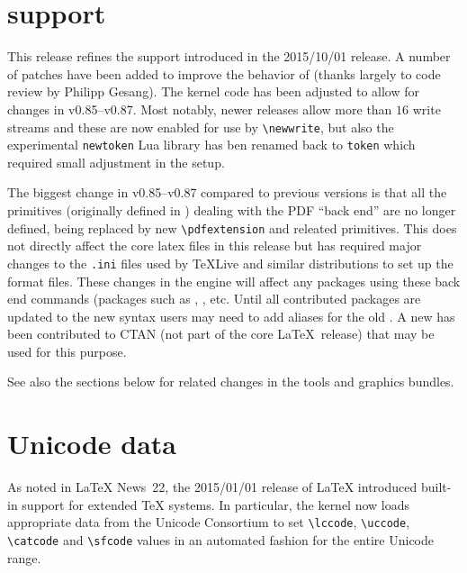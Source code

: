 \documentclass{ltnews}
\begin{document}
\maketitle

\tableofcontents

\section{ support}

This release refines the  support introduced in the
2015/10/01 release. A number of patches have been added to improve the
behavior of  (thanks largely to code review by Philipp Gesang).
The kernel code has been adjusted to
allow for changes in  v0.85--v0.87. Most notably, newer
 releases allow more than $16$ write streams and these are now
enabled for use by \verb|\newwrite|, but also the experimental
\texttt{newtoken} Lua library  has ben renamed back to \texttt{token}
which required small adjustment in the   setup.

The biggest change in   v0.85--v0.87 compared to previous
versions is that all the primitives (originally defined in
) dealing with the PDF ``back end''
are no longer defined, being replaced by new \verb|\pdfextension| and
releated primitives. This does not directly affect the core latex
files in this release but has required major changes to the
\texttt{.ini} files used by \TeX{}Live and similar distributions to
set up the format files. These changes in the   engine
will affect any packages using these back end commands (packages such
as ,  ,   etc.
Until all contributed packages are updated to the new syntax users may
need to add aliases for the old . A new
 has been contributed to CTAN (not part of the
core \LaTeX\ release) that may be used for this purpose. 

See also the sections below for related changes in the
\textsf{tools} and \textsf{graphics} bundles.


\section{Unicode data}

As noted in \LaTeX{} News~22, the 2015/01/01 release of \LaTeX{} introduced
built-in support for extended \TeX{} systems. In particular, the kernel now
loads appropriate data from the Unicode Consortium to set \verb|\lccode|,
\verb|\uccode|, \verb|\catcode| and \verb|\sfcode| values in an automated
fashion for the entire Unicode range.
\end{document}
